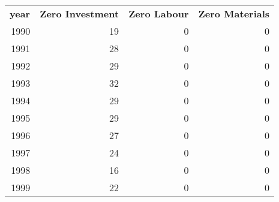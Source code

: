 \begin{tabular}{rrrr}
  \hline
  \textbf{year} & \textbf{Zero Investment} & \textbf{Zero Labour} & \textbf{Zero Materials} \\  
  1990 & 19 & 0 & 0 \\
  1991 & 28 & 0 & 0 \\
  1992 & 29 & 0 & 0 \\
  1993 & 32 & 0 & 0 \\
  1994 & 29 & 0 & 0 \\
  1995 & 29 & 0 & 0 \\
  1996 & 27 & 0 & 0 \\
  1997 & 24 & 0 & 0 \\
  1998 & 16 & 0 & 0 \\
  1999 & 22 & 0 & 0 \\\hline
\end{tabular}
